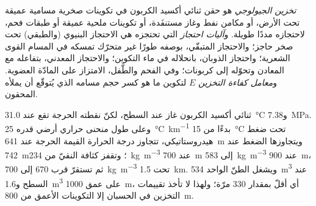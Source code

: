 \begin{definition}\label{def:b2:energy-geology:ccs}
\emph{تخزين  الجيولوجي} هو حقن ثنائي أكسيد
الكربون في تكوينات صخرية مسامية عميقة تحت الأرض، أو مكامن نفط وغاز مستنفَدة، أو تكوينات ملحية
عميقة أو طبقات فحم، لاحتجازه مددًا طويلة. و\emph{آليات احتجاز }
التي تحتجزه هي الاحتجاز البنيوي (والطبقي) تحت صخر حاجز؛ والاحتجاز المتبقّي، بوصفه طورًا
غير متحرّك تمسكه في المسام القوى الشعرية؛ واحتجاز الذوبان، بانحلاله في ماء التكوين؛
والاحتجاز المعدني، بتفاعله مع المعادن وتحوّله إلى كربونات؛ وفي الفحم والطَّفل، الامتزاز على المادّة العضوية.
و\emph{معامل كفاءة التخزين} $E$ لتكوين ما هو كسر حجم مسامه الذي يُتوقّع أن يملأه
 المحقون.
\end{definition}

ثنائي أكسيد الكربون غاز عند السطح، لكنّ نقطته الحرجة تقع عند \qty{31.0}{\celsius}
و\qty{7.38}{MPa}. وعلى طول منحنى حراري أرضي قدره \qty{25}{\celsius\per\km} بدءًا من \qty{15}{\celsius} تحت
ضغط هيدروستاتيكي، تتجاوز درجة الحرارة القيمة الحرجة عند \qty{641}{m} ويتجاوزها الضغط عند
\qty{742}{m}؛ وتقفز كثافة  النقيّ من \qty{234}{kg.m^{-3}} عند \qty{700}{m} إلى
\qty{583}{kg.m^{-3}} عند \qty{900}{m}، ثم تستقرّ قرب 670 إلى \qty{700}{kg.m^{-3}} تحت
\qty{1.5}{km}. ويشغل الطنّ الواحد \qty{534}{m^3} عند السطح و\qty{1.6}{m^3} على عمق \qty{1000}{m}،
أي أقلّ بمقدار 330 مرّة؛ ولهذا لا تأخذ تقييمات التخزين في الحسبان إلا التكوينات الأعمق من
\qty{800}{m}.

